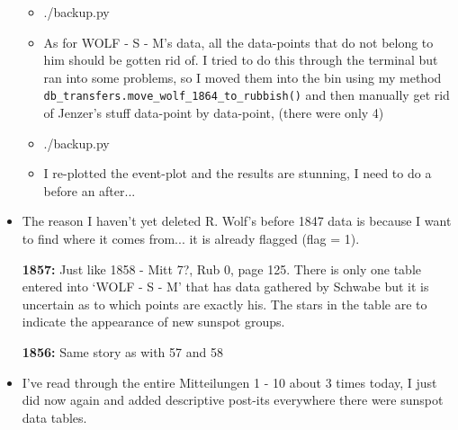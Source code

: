 \documentclass[12pt]{article}
\begin{document}
\begin{itemize}
\begin{itemize}[$\longrightarrow$]
        \item ./backup.py
        \item As for WOLF - S - M's data, all the data-points that do not belong to him should be gotten rid of. I tried to do this through the terminal but ran into some problems, so I moved them into the bin using my method \texttt{db\_transfers.move\_wolf\_1864\_to\_rubbish()} and then manually get rid of Jenzer's stuff data-point by data-point, (there were only 4)
        \item ./backup.py
        \item I re-plotted the event-plot and the results are stunning, I need to do a before an after...
    \end{itemize}
    \item The reason I haven't yet deleted R. Wolf's before 1847 data is because I want to find where it comes from... it is already flagged (flag = 1).
    \item[\textbf{1857:}] Just like 1858 - Mitt 7?, Rub 0, page 125. There is only one table entered into `WOLF - S - M' that has data gathered by Schwabe but it is uncertain as to which points are exactly his. The stars in the table are to indicate the appearance of new sunspot groups.
    \item[\textbf{1856:}] Same story as with 57 and 58
    \item I've read through the entire Mitteilungen 1 - 10 about 3 times today, I just did now again and added descriptive post-its everywhere there were sunspot data tables.
\end{itemize}
\end{document}
